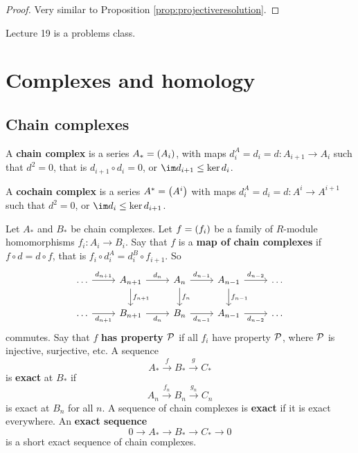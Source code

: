 \begin{proof}
Very similar to Proposition \ref{prop:projectiveresolution}.
\end{proof}


Lecture 19 is a problems class.

\pagebreak

\section{Complexes and homology}

\subsection{Chain complexes}


\begin{definition}
A \textbf{chain complex} is a series $ A_* = \br{A_i} $, with maps $ d_i^A = d_i = d : A_{i + 1} \to A_i $ such that $ d^2 = 0 $, that is $ d_{i + 1} \circ d_i = 0 $, or $ \im d_{i + 1} \le \ker d_i $.
\end{definition}

\begin{definition}
A \textbf{cochain complex} is a series $ A^* = \br{A^i} $ with maps $ d_i^A = d_i = d : A^i \to A^{i + 1} $ such that $ d^2 = 0 $, or $ \im d_i \le \ker d_{i + 1} $.
\end{definition}

Let $ A_* $ and $ B_* $ be chain complexes. Let $ f = \br{f_i} $ be a family of $ R $-module homomorphisms $ f_i : A_i \to B_i $. Say that $ f $ is a \textbf{map of chain complexes} if $ f \circ d = d \circ f $, that is $ f_i \circ d_i^A = d_i^B \circ f_{i + 1} $. So
$$
\begin{tikzcd}
\dots \arrow{r}{d_{n + 1}} & A_{n + 1} \arrow{r}{d_n} \arrow{d}{f_{n + 1}} & A_n \arrow{r}{d_{n - 1}} \arrow{d}{f_n} & A_{n - 1} \arrow{r}{d_{n - 2}} \arrow{d}{f_{n - 1}} & \dots \\
\dots \arrow{r}[swap]{d_{n + 1}} & B_{n + 1} \arrow{r}[swap]{d_n} & B_n \arrow{r}[swap]{d_{n - 1}} & A_{n - 1} \arrow{r}[swap]{d_{n - 2}} & \dots
\end{tikzcd}
$$
commutes. Say that $ f $ \textbf{has property $ \mathcal{P} $} if all $ f_i $ have property $ \mathcal{P} $, where $ \mathcal{P} $ is injective, surjective, etc. A sequence
$$ A_* \xrightarrow{f} B_* \xrightarrow{g} C_* $$
is \textbf{exact} at $ B_* $ if
$$ A_n \xrightarrow{f_n} B_n \xrightarrow{g_n} C_n $$
is exact at $ B_n $ for all $ n $. A sequence of chain complexes is \textbf{exact} if it is exact everywhere. An \textbf{exact sequence}
$$ 0 \to A_* \to B_* \to C_* \to 0 $$
is a short exact sequence of chain complexes.


